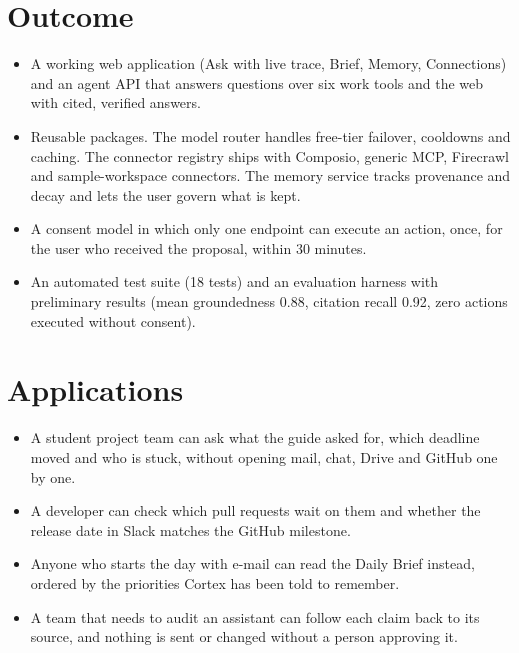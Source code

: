 \documentclass[oneside,a4paper,12pt]{report}
\begin{document}
\section{Outcome}
\begin{itemize}
\item A working web application (Ask with live trace, Brief, Memory, Connections) and an agent API that answers questions over six work tools and the web with cited, verified answers.
\item Reusable packages. The model router handles free-tier failover, cooldowns and caching. The connector registry ships with Composio, generic MCP, Firecrawl and sample-workspace connectors. The memory service tracks provenance and decay and lets the user govern what is kept.
\item A consent model in which only one endpoint can execute an action, once, for the user who received the proposal, within 30 minutes.
\item An automated test suite (18 tests) and an evaluation harness with preliminary results (mean groundedness 0.88, citation recall 0.92, zero actions executed without consent).
\end{itemize}

\section{Applications}
\begin{itemize}
\item A student project team can ask what the guide asked for, which deadline moved and who is stuck, without opening mail, chat, Drive and GitHub one by one.
\item A developer can check which pull requests wait on them and whether the release date in Slack matches the GitHub milestone.
\item Anyone who starts the day with e-mail can read the Daily Brief instead, ordered by the priorities Cortex has been told to remember.
\item A team that needs to audit an assistant can follow each claim back to its source, and nothing is sent or changed without a person approving it.
\end{itemize}
\end{document}
